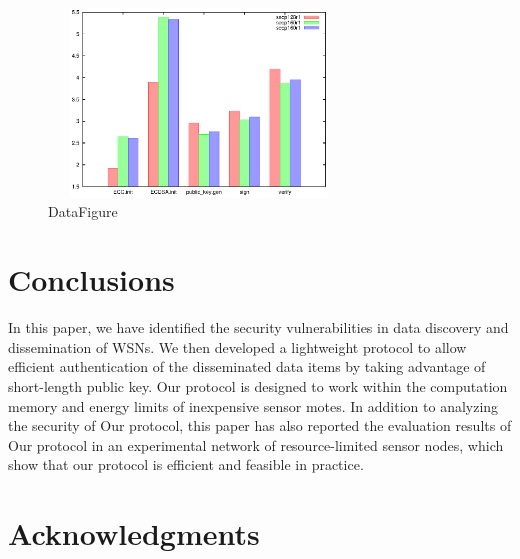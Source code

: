 \documentclass{sig-alternate-05-2015}
\begin{document}
\begin{figure}[ht]
\begin{center}
\includegraphics[width=8cm,height=5cm]{2.eps}
\end{center}
\caption{DataFigure}\label{fig:SSDArchitecture}
\end{figure}


\section{Conclusions}

In this paper, we have identified the security vulnerabilities in data discovery and dissemination of WSNs. We then developed a lightweight protocol  to allow efficient authentication of the disseminated data items by taking advantage of short-length public key. Our protocol is designed to work within the computation memory and energy limits of inexpensive sensor motes. In addition to analyzing the security of Our protocol, this paper has also reported the evaluation results of Our protocol in an experimental network of resource-limited sensor nodes, which show that our protocol is efficient and feasible in practice.


\section{Acknowledgments}



\appendix
\end{document}
